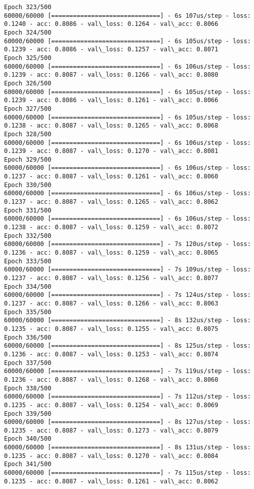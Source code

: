 \documentclass[11pt]{article}
\begin{document}
\begin{Verbatim}[commandchars=\\\{\}]
Epoch 323/500
60000/60000 [==============================] - 6s 107us/step - loss: 0.1240 - acc: 0.8086 - val\_loss: 0.1264 - val\_acc: 0.8066
Epoch 324/500
60000/60000 [==============================] - 6s 105us/step - loss: 0.1239 - acc: 0.8086 - val\_loss: 0.1257 - val\_acc: 0.8071
Epoch 325/500
60000/60000 [==============================] - 6s 106us/step - loss: 0.1239 - acc: 0.8087 - val\_loss: 0.1266 - val\_acc: 0.8080
Epoch 326/500
60000/60000 [==============================] - 6s 105us/step - loss: 0.1239 - acc: 0.8086 - val\_loss: 0.1261 - val\_acc: 0.8066
Epoch 327/500
60000/60000 [==============================] - 6s 105us/step - loss: 0.1238 - acc: 0.8087 - val\_loss: 0.1265 - val\_acc: 0.8068
Epoch 328/500
60000/60000 [==============================] - 6s 106us/step - loss: 0.1239 - acc: 0.8087 - val\_loss: 0.1270 - val\_acc: 0.8081
Epoch 329/500
60000/60000 [==============================] - 6s 106us/step - loss: 0.1237 - acc: 0.8087 - val\_loss: 0.1261 - val\_acc: 0.8060
Epoch 330/500
60000/60000 [==============================] - 6s 106us/step - loss: 0.1237 - acc: 0.8087 - val\_loss: 0.1265 - val\_acc: 0.8062
Epoch 331/500
60000/60000 [==============================] - 6s 106us/step - loss: 0.1238 - acc: 0.8087 - val\_loss: 0.1259 - val\_acc: 0.8072
Epoch 332/500
60000/60000 [==============================] - 7s 120us/step - loss: 0.1236 - acc: 0.8087 - val\_loss: 0.1259 - val\_acc: 0.8065
Epoch 333/500
60000/60000 [==============================] - 7s 109us/step - loss: 0.1237 - acc: 0.8087 - val\_loss: 0.1256 - val\_acc: 0.8077
Epoch 334/500
60000/60000 [==============================] - 7s 124us/step - loss: 0.1237 - acc: 0.8087 - val\_loss: 0.1266 - val\_acc: 0.8063
Epoch 335/500
60000/60000 [==============================] - 8s 132us/step - loss: 0.1235 - acc: 0.8087 - val\_loss: 0.1255 - val\_acc: 0.8075
Epoch 336/500
60000/60000 [==============================] - 8s 125us/step - loss: 0.1236 - acc: 0.8087 - val\_loss: 0.1253 - val\_acc: 0.8074
Epoch 337/500
60000/60000 [==============================] - 7s 119us/step - loss: 0.1236 - acc: 0.8087 - val\_loss: 0.1268 - val\_acc: 0.8060
Epoch 338/500
60000/60000 [==============================] - 7s 112us/step - loss: 0.1235 - acc: 0.8087 - val\_loss: 0.1254 - val\_acc: 0.8069
Epoch 339/500
60000/60000 [==============================] - 8s 127us/step - loss: 0.1235 - acc: 0.8087 - val\_loss: 0.1273 - val\_acc: 0.8079
Epoch 340/500
60000/60000 [==============================] - 8s 131us/step - loss: 0.1235 - acc: 0.8087 - val\_loss: 0.1270 - val\_acc: 0.8084
Epoch 341/500
60000/60000 [==============================] - 7s 115us/step - loss: 0.1235 - acc: 0.8087 - val\_loss: 0.1261 - val\_acc: 0.8062

\end{Verbatim}
\end{document}
